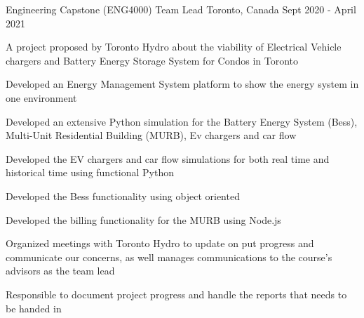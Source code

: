 


\begin{cventries}


\cventry
{Engineering Capstone (ENG4000)} %
{Team Lead} %
{Toronto, Canada} %
{Sept 2020 - April 2021} %
{ %
\begin{cvitems}
\item {A project proposed by Toronto Hydro about the viability of Electrical Vehicle chargers and Battery Energy Storage System for Condos in Toronto}
\item {Developed an Energy Management System platform to show the energy system in one environment}
\item {Developed an extensive Python simulation for the Battery Energy System (Bess), Multi-Unit Residential Building (MURB), Ev chargers and car flow}
\item {Developed the EV chargers and car flow simulations for both real time and historical time using functional Python}
\item {Developed the Bess functionality using object oriented}
\item {Developed the billing functionality for the MURB using Node.js}
\item {Organized meetings with Toronto Hydro to update on put progress and communicate our concerns, as well manages communications to the course's advisors as the team lead}
\item {Responsible to document project progress and handle the reports that needs to be handed in}
\end{cvitems}
}


\end{cventries}
